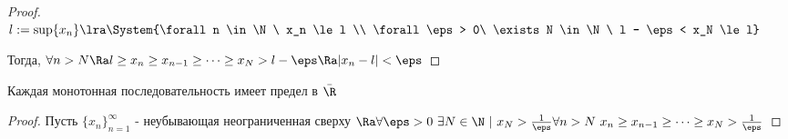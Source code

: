 \begin{proof}
	$l := \sup \{x_n\} \lra \System{\forall n \in \N\ x_n \le l \\ \forall \eps > 0\ \exists N \in \N\ l - \eps < x_N \le l}$
	
	Тогда, $\forall n > N \Ra l \ge x_n \ge x_{n - 1} \ge \dots \ge x_N > l - \eps \Ra |x_n - l| < \eps$
\end{proof}

\begin{addition}
	Каждая монотонная последовательность имеет предел в $\bar{\R}$
\end{addition}

\begin{proof}
	Пусть $\{x_n\}_{n = 1}^\infty$ - неубывающая неограниченная сверху $\Ra \forall \eps > 0\ \exists N \in \N\ |\ x_N > \frac{1}{\eps} \forall n > N\ x_n \ge x_{n - 1} \ge \dots \ge x_N > \frac{1}{\eps}$
\end{proof}


